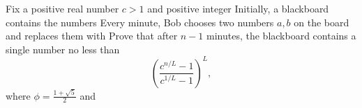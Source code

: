 Fix a positive real number $c>1$ and positive integer   Initially, a blackboard contains the numbers   Every minute, Bob chooses two numbers $a,b$ on the board and replaces them with   Prove that after $n-1$ minutes, the blackboard contains a single number no less than \[\left(\dfrac{c^{n/L}-1}{c^{1/L}-1}\right)^L,\] where $\phi=\tfrac{1+\sqrt 5}2$ and 